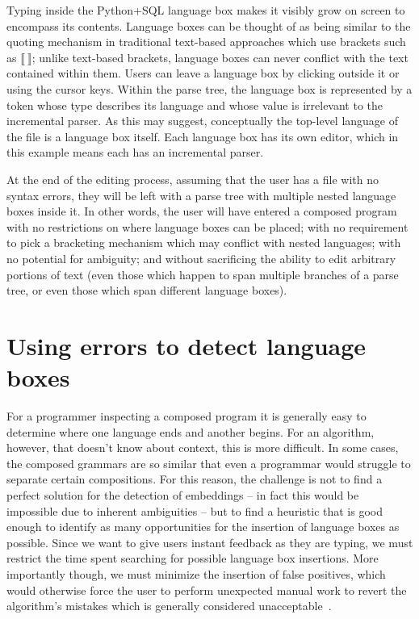 \documentclass[sigplan,screen]{acmart}\settopmatter{printfolios=true,printccs=false,printacmref=false}
\begin{document}
Typing inside the Python+SQL language box makes it visibly grow on screen to
encompass its contents. Language boxes can be thought of
as being similar to the quoting mechanism in traditional text-based approaches
which use brackets such as $\llbracket~\rrbracket$; unlike text-based brackets,
language boxes can never conflict with the text contained within them. Users can
leave a language box by clicking outside it or using the cursor keys.
Within the parse tree, the
language box is represented by a token whose type describes its language and whose
value is irrelevant to the incremental parser. As this may suggest, conceptually the top-level
language of the file is a language box itself. Each language
box has its own editor, which in this example means each has an incremental
parser.

At the end of the editing process, assuming that the user has a file with no syntax
errors, they will be left with a parse tree with multiple nested language boxes inside
it. In other words, the user will have entered a
composed program with no restrictions on where language boxes can be placed; with no
requirement to pick a bracketing mechanism which may conflict with nested
languages; with no potential for ambiguity; and without sacrificing the ability
to edit arbitrary portions of text (even those which happen to span multiple
branches of a parse tree, or even those which span different language boxes).

\section{Using errors to detect language boxes}
\label{sec_finding_lbox_candidates}

For a programmer inspecting a composed program it is generally easy
to determine where one language ends and another begins.
For an algorithm, however, that doesn't know about context, this is more difficult.
In some cases, the composed grammars are so similar that even a programmar would
struggle to separate certain compositions.
For this reason, the challenge is not to find a perfect solution for the detection
of embeddings -- in fact this would be impossible due to inherent ambiguities -- but
to find a heuristic that is good enough to identify as many
opportunities for the insertion of language boxes as possible.
Since we want to give users instant feedback as they are typing, we must restrict
the time spent searching for possible language box insertions.
More importantly though, we
must minimize the insertion of false positives, which would otherwise force the
user to perform unexpected manual work to revert the algorithm's mistakes which
is generally considered
unacceptable~\cite{vanter00displaying,lewis95designing,vanter94practical}.
\end{document}
